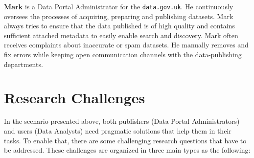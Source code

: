 \textbf{Mark} is a Data Portal Administrator for the \texttt{data.gov.uk}. He continuously oversees the processes of acquiring, preparing and publishing datasets. Mark always tries to ensure that the data published is of high quality and contains sufficient attached metadata to easily enable search and discovery. Mark often receives complaints about inaccurate or spam datasets. He manually removes and fix errors while keeping open communication channels with the data-publishing departments.

\section{Research Challenges} \label{sec:challenges}

In the scenario presented above, both publishers (Data Portal Administrators) and users (Data Analysts) need pragmatic solutions that help them in their tasks. To enable that, there are some challenging research questions that have to be addressed. These challenges are organized in three main types as the following:

